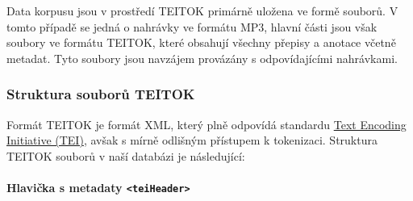 \documentclass[
]{article}
\begin{document}
Data korpusu jsou v prostředí TEITOK primárně uložena ve formě souborů.
V tomto případě se jedná o nahrávky ve formátu MP3, hlavní části jsou
však soubory ve formátu TEITOK, které obsahují všechny přepisy a anotace
včetně metadat. Tyto soubory jsou navzájem provázány s odpovídajícími
nahrávkami.

\hypertarget{struktura-souborux16f-teitok}{%
\subsubsection{Struktura souborů
TEITOK}\label{struktura-souborux16f-teitok}}

Formát TEITOK je formát XML, který plně odpovídá standardu
\href{https://www.tei-c.org/}{Text Encoding Initiative (TEI)}, avšak s
mírně odlišným přístupem k tokenizaci. Struktura TEITOK souborů v naší
databázi je následující:

\hypertarget{hlaviux10dka-s-metadaty-teiheader}{%
\paragraph{\texorpdfstring{Hlavička s metadaty
\texttt{\textless{}teiHeader\textgreater{}}}{Hlavička s metadaty \textless teiHeader\textgreater{}}}\label{hlaviux10dka-s-metadaty-teiheader}}
\end{document}
